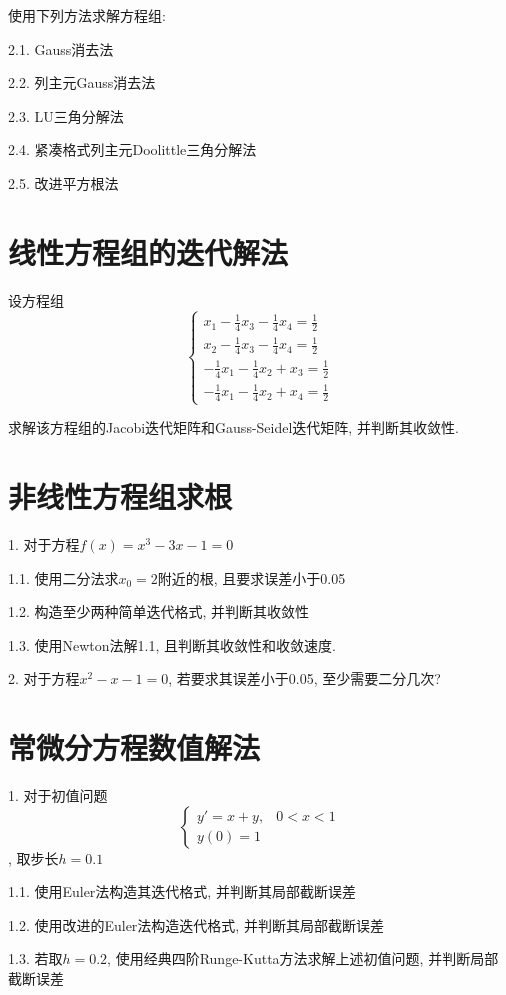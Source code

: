使用下列方法求解方程组:

2.1. Gauss消去法

2.2. 列主元Gauss消去法

2.3. LU三角分解法

2.4. 紧凑格式列主元Doolittle三角分解法

2.5. 改进平方根法

\section*{线性方程组的迭代解法}

设方程组
\begin{equation*}
    \begin{cases}
        x_1-\frac{1}{4}x_3-\frac{1}{4}x_4=\frac{1}{2}\\
        x_2-\frac{1}{4}x_3-\frac{1}{4}x_4=\frac{1}{2}\\
        -\frac{1}{4}x_1-\frac{1}{4}x_2+x_3=\frac{1}{2}\\
        -\frac{1}{4}x_1-\frac{1}{4}x_2+x_4=\frac{1}{2}
    \end{cases}
\end{equation*}

求解该方程组的Jacobi迭代矩阵和Gauss-Seidel迭代矩阵, 并判断其收敛性.

\section*{非线性方程组求根}

1. 对于方程$f(x)=x^3-3x-1=0$

1.1. 使用二分法求$x_0=2$附近的根, 且要求误差小于0.05

1.2. 构造至少两种简单迭代格式, 并判断其收敛性

1.3. 使用Newton法解1.1, 且判断其收敛性和收敛速度.

2. 对于方程$x^2-x-1=0$, 若要求其误差小于0.05, 至少需要二分几次?

\section*{常微分方程数值解法}

1. 对于初值问题
\begin{equation*}
    \begin{cases}
        y'=x+y, &0<x<1\\
        y(0)=1
    \end{cases}
\end{equation*}, 取步长$h=0.1$

1.1. 使用Euler法构造其迭代格式, 并判断其局部截断误差

1.2. 使用改进的Euler法构造迭代格式, 并判断其局部截断误差

1.3. 若取$h=0.2$, 使用经典四阶Runge-Kutta方法求解上述初值问题, 并判断局部截断误差